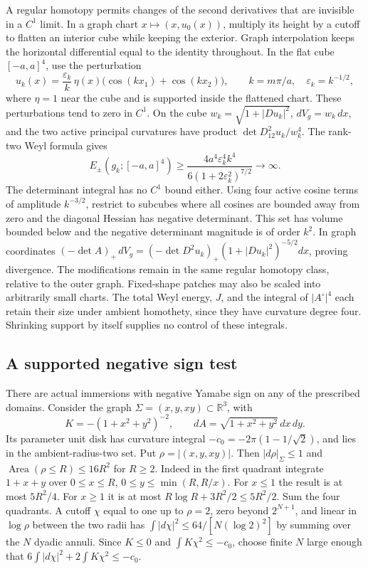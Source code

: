 \documentclass[11pt,letterpaper]{article}
\numberwithin{equation}{section}
\newcommand{\R}{\mathbb R}
\begin{document}
A regular homotopy permits changes of the second derivatives
that are invisible in a \(C^1\) limit. In a graph chart
\(x\mapsto(x,u_0(x))\), multiply its height by a cutoff to
flatten an interior cube while keeping the exterior.
Graph interpolation keeps the horizontal differential
equal to the identity throughout. In the flat cube
\([-a,a]^4\), use the perturbation
\[
 u_k(x)=\frac{\varepsilon_k}{k}\,\eta(x)
               \bigl(\cos(kx_1)+\cos(kx_2)\bigr),
 \qquad k=m\pi/a,\quad \varepsilon_k=k^{-1/2},
\]
where \(\eta=1\) near the cube and is supported inside the
flattened chart. These perturbations tend to zero in \(C^1\).
On the cube \(w_k=\sqrt{1+|Du_k|^2}\), \(dV_g=w_k\,dx\),
and the two active principal curvatures have product
\(\det D^2_{12}u_k/w_k^4\). The rank-two Weyl formula gives
\[
 E_\pm(g_k;[-a,a]^4)
 \ge\frac{4a^4\varepsilon_k^4k^4}{6(1+2\varepsilon_k^2)^{7/2}}
 \longrightarrow\infty .
\]
The determinant integral has no \(C^1\) bound either.
Using four active cosine terms of amplitude \(k^{-3/2}\),
restrict to subcubes where all cosines are bounded away
from zero and the diagonal Hessian has negative
determinant. This set has volume bounded below and the
negative determinant magnitude is of order \(k^2\).
In graph coordinates \((-\det A)_+\,dV_g=
(-\det D^2u_k)_+ (1+|Du_k|^2)^{-5/2}dx\), proving divergence.
The modifications remain in the same regular homotopy
class, relative to the outer graph. Fixed-shape patches
may also be scaled into arbitrarily small charts. The
total Weyl energy, \(J\), and the integral of
\(|A^\circ|^4\) each retain their size under ambient
homothety, since they have curvature degree four.
Shrinking support by itself supplies no control of these
integrals.

\subsection{A supported negative sign test}

There are actual immersions with negative Yamabe sign on any
of the prescribed domains. Consider the graph
\(\Sigma=(x,y,xy)\subset\R^3\), with
\[
 K=-(1+x^2+y^2)^{-2},\qquad dA=\sqrt{1+x^2+y^2}\,dx\,dy .
\]
Its parameter unit disk has curvature integral
\(-c_0=-2\pi(1-1/\sqrt2)\), and lies in the ambient-radius-two
set. Put \(\rho=|(x,y,xy)|\). Then \(|d\rho|_\Sigma\le1\) and
\(\operatorname{Area}(\rho\le R)\le16R^2\) for \(R\ge2\).
Indeed in the first quadrant integrate \(1+x+y\) over
\(0\le x\le R\), \(0\le y\le\min(R,R/x)\). For \(x\le1\)
the result is at most \(5R^2/4\). For \(x\ge1\) it is at
most \(R\log R+3R^2/2\le5R^2/2\). Sum the four quadrants.
A cutoff \(\chi\) equal to one up to \(\rho=2\), zero beyond
\(2^{N+1}\), and linear in \(\log\rho\) between the two
radii has \(\int|d\chi|^2\le64/[N(\log 2)^2]\) by summing
over the \(N\) dyadic annuli. Since \(K\le0\) and
\(\int K\chi^2\le-c_0\), choose finite \(N\) large enough
that \(6\int|d\chi|^2+2\int K\chi^2\le-c_0\).
\end{document}
